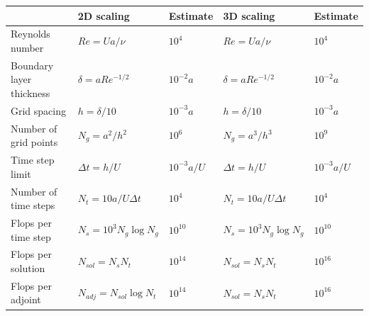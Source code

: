 \begin{table}[h] 
\small
\begin{tabular}{| p{3.5cm} | l l | l l |}
\hline
                                                                      &       2D scaling                                         &      Estimate                &           3D scaling                                   &             Estimate              \\
\hline
Reynolds number                                      &      $Re = Ua/\nu$                                    &      $10^4$                &            $Re = Ua/\nu$                             &            $10^4$                \\
Boundary layer thickness                        &      $\delta=aRe^{-1/2}$                          &      $10^{-2}a$           &            $\delta=aRe^{-1/2}$                   &           $10^{-2}a$          \\
Grid spacing                                               &     $h = \delta/10$                                    &      $10^{-3}a$           &            $ h = \delta/10$                           &            $10^{-3}a$          \\
Number of grid points                               &     $N_g = a^2/h^2$                                &      $10^6$                 &            $N_g = a^3/h^3$                        &            $10^9$                 \\
Time step limit                                            &     $\Delta t = h/U$                                   &      $10^{-3}a/U$       &            $\Delta t = h/U$                           &            $10^{-3}a/U$       \\
Number of time steps                                &     $N_t = 10a/U\Delta t$                       &       $10^4$                 &            $N_t = 10a/U\Delta t$                &            $10^4$                 \\
Flops per time step                                    &     $N_s = 10^3N_g\log N_g$              &      $10^{10}$             &            $N_s = 10^3N_g\log N_g$       &           $10^{10}$            \\
Flops per solution                                      &     $N_{sol} = N_s N_t $                        &       $10^{14}$            &             $N_{sol} = N_s N_t $                 &           $10^{16}$            \\
Flops per adjoint                                        &     $N_{adj} = N_{sol} \log N_t $          &       $10^{14}$            &             $N_{sol} = N_s N_t $                 &           $10^{16}$             \\

\end{tabular}
\end{table}
